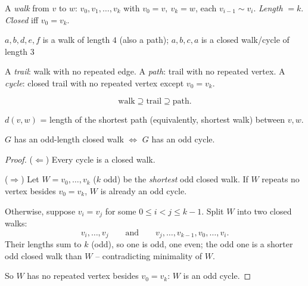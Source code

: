 \documentclass[11pt]{article}
\begin{document}
\begin{definition}
A \emph{walk} from $v$ to $w$: $v_0,v_1,\dots,v_k$ with $v_0=v,\ v_k=w$, each $v_{i-1}\sim v_i$. \emph{Length} $=k$. \emph{Closed} iff $v_0=v_k$.
\end{definition}

\begin{center}
\end{center}
\begin{center}
\small $a,b,d,e,f$ is a walk of length $4$ (also a path); $a,b,c,a$ is a closed walk/cycle of length $3$
\end{center}

\begin{definition}
A \emph{trail}: walk with no repeated edge. A \emph{path}: trail with no repeated vertex. A \emph{cycle}: closed trail with no repeated vertex except $v_0=v_k$.
\end{definition}

\begin{note}
\[
\text{walk} \supseteq \text{trail} \supseteq \text{path}.
\]
\end{note}

\begin{definition}[Distance]
$d(v,w)$ = length of the shortest path (equivalently, shortest walk) between $v,w$.
\end{definition}

\bigskip
\begin{theorem}
$G$ has an odd-length closed walk $\iff$ $G$ has an odd cycle.
\end{theorem}
\begin{proof}
($\Leftarrow$) Every cycle is a closed walk.

($\Rightarrow$) Let $W=v_0,\dots,v_k$ ($k$ odd) be the \emph{shortest} odd closed walk. If $W$ repeats no vertex besides $v_0=v_k$, $W$ is already an odd cycle.

Otherwise, suppose $v_i=v_j$ for some $0\le i<j\le k-1$. Split $W$ into two closed walks:
\[
v_i,\dots,v_j \qquad \text{and} \qquad v_j,\dots,v_{k-1},v_0,\dots,v_i.
\]
Their lengths sum to $k$ (odd), so one is odd, one even; the odd one is a shorter odd closed walk than $W$ -- contradicting minimality of $W$.

So $W$ has no repeated vertex besides $v_0=v_k$: $W$ is an odd cycle.
\end{proof}
\end{document}
